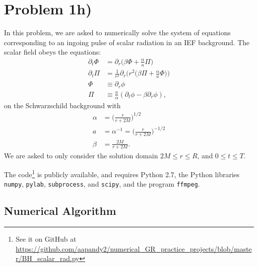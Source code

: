 \documentclass[12pt]{article}
\numberwithin{equation}{section}
\begin{document}
\section{Problem 1h)}
In this problem, we are asked to numerically solve the system of equations corresponding to an ingoing pulse of scalar radiation in an IEF background.  The scalar field obeys the equations:
\begin{equation*}
\begin{aligned}
\partial_t \Phi &= \partial_r \Big( \beta \Phi + \frac{\alpha}{a} \Pi \Big) \\
\partial_t \Pi  &= \frac{1}{r^2} \partial_r \Big( r^2 \Big( \beta \Pi + \frac{\alpha}{a} \Phi \Big) \Big) \\
\Phi &\equiv \partial_r \phi \\
\Pi  &\equiv \frac{a}{\alpha} (\partial_t \phi - \beta \partial_r \phi),
\end{aligned}
\end{equation*}
on the Schwarzschild background with
\begin{equation*}
\begin{aligned}
\alpha &= \Big( \frac{r}{r + 2 M} \Big)^{1/2} \\
a &= \alpha^{-1} = \Big( \frac{r}{r + 2 M} \Big)^{-1/2} \\
\beta &= \frac{2 M}{r + 2 M}.
\end{aligned}
\end{equation*}
We are asked to only consider the solution domain $2 M \leq r \leq R$, and $0 \leq t \leq T$.

The code\footnote{See it on GitHub at \url{https://github.com/aapandy2/numerical_GR_practice_projects/blob/master/BH_scalar_rad.py}} is publicly available, and requires Python 2.7, the Python libraries \texttt{numpy}, \texttt{pylab}, \texttt{subprocess}, and \texttt{scipy}, and the program \texttt{ffmpeg}.

\subsection{Numerical Algorithm}
\end{document}
